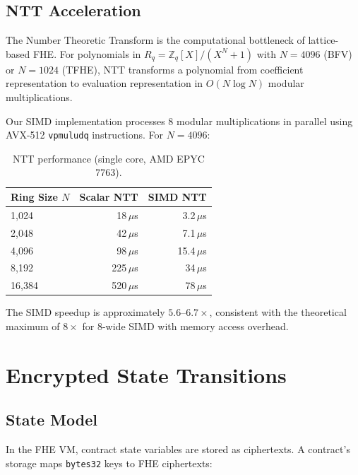 \documentclass[11pt,a4paper]{article}
\begin{document}
\subsection{NTT Acceleration}

The Number Theoretic Transform is the computational bottleneck of lattice-based FHE.
For polynomials in $R_q = \mathbb{Z}_q[X]/(X^N + 1)$ with $N = 4096$ (BFV) or
$N = 1024$ (TFHE), NTT transforms a polynomial from coefficient representation to
evaluation representation in $O(N \log N)$ modular multiplications.

Our SIMD implementation processes 8 modular multiplications in parallel using AVX-512
\texttt{vpmuludq} instructions. For $N = 4096$:

\begin{table}[ht]
\centering
\caption{NTT performance (single core, AMD EPYC 7763).}
\label{tab:ntt-benchmarks}
\begin{tabular}{lrr}
\toprule
\textbf{Ring Size $N$} & \textbf{Scalar NTT} & \textbf{SIMD NTT} \\
\midrule
1{,}024 & 18\,$\mu$s & 3.2\,$\mu$s \\
2{,}048 & 42\,$\mu$s & 7.1\,$\mu$s \\
4{,}096 & 98\,$\mu$s & 15.4\,$\mu$s \\
8{,}192 & 225\,$\mu$s & 34\,$\mu$s \\
16{,}384 & 520\,$\mu$s & 78\,$\mu$s \\
\bottomrule
\end{tabular}
\end{table}

The SIMD speedup is approximately $5.6\text{--}6.7\times$, consistent with the
theoretical maximum of $8\times$ for 8-wide SIMD with memory access overhead.

\section{Encrypted State Transitions}
\label{sec:state-transitions}

\subsection{State Model}

In the FHE VM, contract state variables are stored as ciphertexts. A contract's
storage maps \texttt{bytes32} keys to FHE ciphertexts:
\end{document}
